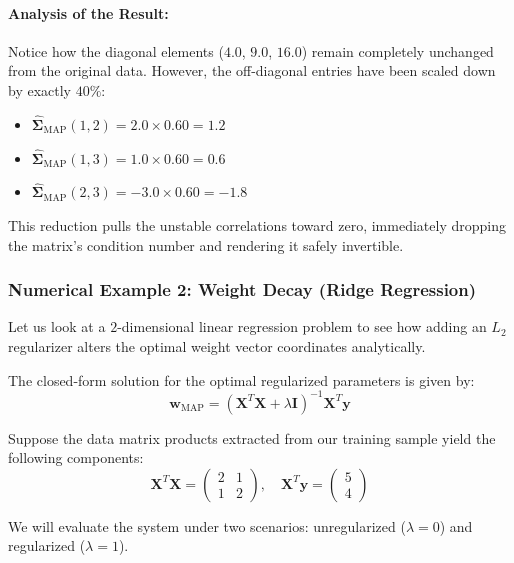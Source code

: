 \documentclass{article}
\begin{document}
\paragraph{Analysis of the Result:}
Notice how the diagonal elements ($4.0$, $9.0$, $16.0$) remain completely unchanged from the original data. However, the off-diagonal entries have been scaled down by exactly $40\%$:
\begin{itemize}
    \item $\hat{\boldsymbol{\Sigma}}_{\text{MAP}}(1,2) = 2.0 \times 0.60 = 1.2$
    \item $\hat{\boldsymbol{\Sigma}}_{\text{MAP}}(1,3) = 1.0 \times 0.60 = 0.6$
    \item $\hat{\boldsymbol{\Sigma}}_{\text{MAP}}(2,3) = -3.0 \times 0.60 = -1.8$
\end{itemize}
This reduction pulls the unstable correlations toward zero, immediately dropping the matrix's condition number and rendering it safely invertible.

\subsubsection{Numerical Example 2: Weight Decay (Ridge Regression)}

Let us look at a $2$-dimensional linear regression problem to see how adding an $L_2$ regularizer alters the optimal weight vector coordinates analytically. 

The closed-form solution for the optimal regularized parameters is given by:
\begin{equation}
\mathbf{w}_{\text{MAP}} = (\mathbf{X}^T\mathbf{X} + \lambda \mathbf{I})^{-1}\mathbf{X}^T\mathbf{y}
\end{equation}

Suppose the data matrix products extracted from our training sample yield the following components:
\begin{equation}
\mathbf{X}^T\mathbf{X} = \begin{pmatrix} 2 & 1 \\ 1 & 2 \end{pmatrix}, \quad \mathbf{X}^T\mathbf{y} = \begin{pmatrix} 5 \\ 4 \end{pmatrix}
\end{equation}

We will evaluate the system under two scenarios: unregularized ($\lambda = 0$) and regularized ($\lambda = 1$).
\end{document}
